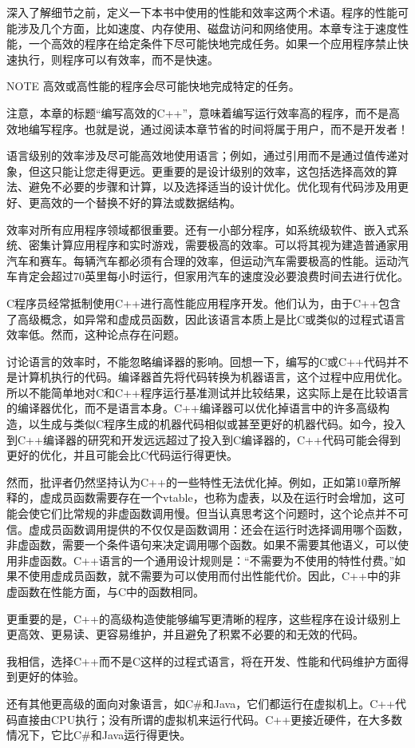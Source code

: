 
深入了解细节之前，定义一下本书中使用的性能和效率这两个术语。程序的性能可能涉及几个方面，比如速度、内存使用、磁盘访问和网络使用。本章专注于速度性能，一个高效的程序在给定条件下尽可能快地完成任务。如果一个应用程序禁止快速执行，则程序可以有效率，而不是快速。

\begin{myNotic}{NOTE}
高效或高性能的程序会尽可能快地完成特定的任务。
\end{myNotic}

注意，本章的标题“编写高效的C++”，意味着编写运行效率高的程序，而不是高效地编写程序。也就是说，通过阅读本章节省的时间将属于用户，而不是开发者！


语言级别的效率涉及尽可能高效地使用语言；例如，通过引用而不是通过值传递对象，但这只能让您走得更远。更重要的是设计级别的效率，这包括选择高效的算法、避免不必要的步骤和计算，以及选择适当的设计优化。优化现有代码涉及用更好、更高效的一个替换不好的算法或数据结构。


效率对所有应用程序领域都很重要。还有一小部分程序，如系统级软件、嵌入式系统、密集计算应用程序和实时游戏，需要极高的效率。可以将其视为建造普通家用汽车和赛车。每辆汽车都必须有合理的效率，但运动汽车需要极高的性能。运动汽车肯定会超过70英里每小时运行，但家用汽车的速度没必要浪费时间去进行优化。


C程序员经常抵制使用C++进行高性能应用程序开发。他们认为，由于C++包含了高级概念，如异常和虚成员函数，因此该语言本质上是比C或类似的过程式语言效率低。然而，这种论点存在问题。

讨论语言的效率时，不能忽略编译器的影响。回想一下，编写的C或C++代码并不是计算机执行的代码。编译器首先将代码转换为机器语言，这个过程中应用优化。所以不能简单地对C和C++程序运行基准测试并比较结果，这实际上是在比较语言的编译器优化，而不是语言本身。C++编译器可以优化掉语言中的许多高级构造，以生成与类似C程序生成的机器代码相似或甚至更好的机器代码。如今，投入到C++编译器的研究和开发远远超过了投入到C编译器的，C++代码可能会得到更好的优化，并且可能会比C代码运行得更快。

然而，批评者仍然坚持认为C++的一些特性无法优化掉。例如，正如第10章所解释的，虚成员函数需要存在一个vtable，也称为虚表，以及在运行时会增加，这可能会使它们比常规的非虚函数调用慢。但当认真思考这个问题时，这个论点并不可信。虚成员函数调用提供的不仅仅是函数调用：还会在运行时选择调用哪个函数，非虚函数，需要一个条件语句来决定调用哪个函数。如果不需要其他语义，可以使用非虚函数。C++语言的一个通用设计规则是：“不需要为不使用的特性付费。”如果不使用虚成员函数，就不需要为可以使用而付出性能代价。因此，C++中的非虚函数在性能方面，与C中的函数相同。

更重要的是，C++的高级构造使能够编写更清晰的程序，这些程序在设计级别上更高效、更易读、更容易维护，并且避免了积累不必要的和无效的代码。

我相信，选择C++而不是C这样的过程式语言，将在开发、性能和代码维护方面得到更好的体验。

还有其他更高级的面向对象语言，如C\#和Java，它们都运行在虚拟机上。C++代码直接由CPU执行；没有所谓的虚拟机来运行代码。C++更接近硬件，在大多数情况下，它比C\#和Java运行得更快。









